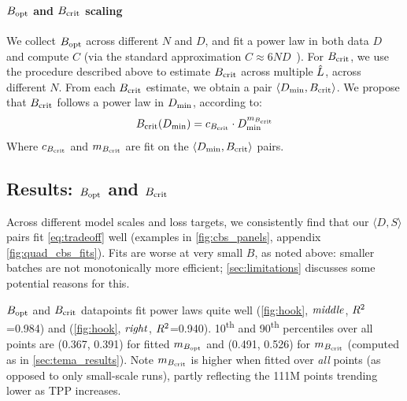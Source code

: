 \paragraph{$B_{\text{opt}}$ and $B_{\text{crit}}$ scaling}

We collect $B_{\text{opt}}$ across different $N$ and $D$, and fit a power law
in both data $D$ and compute $C$ (via the standard approximation
$C \approx 6ND$~\citep{kaplan2020scaling,hoffmann2022empirical}).
%
For $B_{\text{crit}}$, we use the procedure described above to estimate $B_{\text{crit}}$
across multiple $\hat{L}$, across different $N$.  From each $B_{\text{crit}}$
estimate, we obtain a pair $\langle D_{\text{min}}, B_{\text{crit}} \rangle$.
%
We propose that $B_{\text{crit}}$ follows a power law in $D_{\text{min}}$, according to:
\begin{equation}\label{eq:cbs_scaling}
  B_{\text{crit}}(D_{\text{min}}) = {c_{B_{\text{crit}}}} \cdot D_{\text{min}}^{m_{B_{\text{crit}}}}
\end{equation}
Where $c_{B_{\text{crit}}}$ and $m_{B_{\text{crit}}}$ are fit on the $\langle D_{\text{min}}, B_{\text{crit}} \rangle$
pairs.

\subsection{Results: $B_{\text{opt}}$ and $B_{\text{crit}}$}\label{sec:results_cbs}




Across different model scales and loss targets, we consistently find
that our $\langle D, S \rangle$ pairs fit \cref{eq:tradeoff} well
(examples in \cref{fig:cbs_panels}, appendix
\cref{fig:quad_cbs_fits}).
%
Fits are worse at very small $B$, as noted above: smaller batches are
not monotonically more efficient; \cref{sec:limitations} discusses
some potential reasons for this.


%


$B_{\text{opt}}$ and $B_{\text{crit}}$ datapoints fit power laws quite well
(\cref{fig:hook}, $\text{\emph{middle}}$, $R^{2}$=0.984) and (\cref{fig:hook},
$\text{\emph{right}}$, $R^{2}$=0.940).
%
10\textsuperscript{th} and 90\textsuperscript{th} percentiles over all
points are (0.367, 0.391) for fitted $m_{B_{\text{opt}}}$ and (0.491, 0.526) for
$m_{B_{\text{crit}}}$ (computed as in \cref{sec:tema_results}).  Note $m_{B_{\text{crit}}}$ is
higher when fitted over \emph{all} points (as opposed to only
small-scale runs), partly reflecting the 111M points trending lower as
TPP increases.

